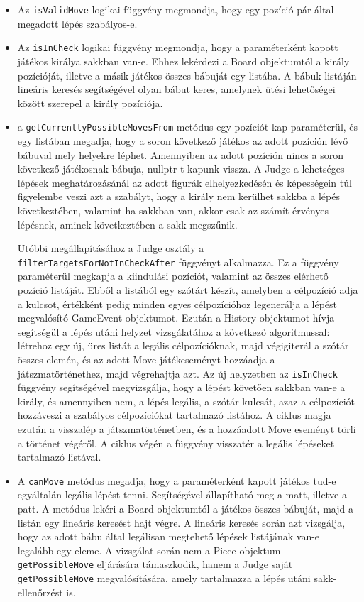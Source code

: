\documentclass[12pt, twoside]{report}
\begin{document}
\begin{itemize}
	\item Az {\tt isValidMove} logikai függvény megmondja, hogy egy pozíció-pár által megadott lépés szabályos-e.
	
	\item Az {\tt isInCheck} logikai függvény megmondja, hogy a paraméterként kapott játékos királya sakkban van-e. Ehhez lekérdezi a Board objektumtól a király pozícióját, illetve a másik játékos összes bábuját egy listába. A bábuk listáján lineáris keresés segítségével olyan bábut keres, amelynek ütési lehetőségei között szerepel a király pozíciója.
	
	\item a {\tt getCurrentlyPossibleMovesFrom} metódus egy pozíciót kap paraméterül,  és egy listában megadja, hogy a soron következő játékos az adott pozíción lévő bábuval mely helyekre léphet. Amennyiben az adott pozíción nincs a soron következő játékosnak bábuja, nullptr-t kapunk vissza. A Judge a lehetséges lépések meghatározásánál az adott figurák elhelyezkedésén és képességein túl figyelembe veszi azt a szabályt, hogy a király nem kerülhet sakkba a lépés következtében, valamint ha sakkban van, akkor csak az számít érvényes lépésnek, aminek következtében a sakk megszűnik.
	
	Utóbbi megállapításához a Judge osztály a {\tt filterTargetsForNotInCheckAfter} függvényt alkalmazza. Ez a függvény paraméterül megkapja a kiindulási pozíciót, valamint az összes elérhető pozíció listáját. Ebből a listából egy szótárt készít, amelyben a célpozíció adja a kulcsot, értékként pedig minden egyes célpozícióhoz legenerálja a lépést megvalósító GameEvent objektumot. Ezután a History objektumot hívja segítségül a lépés utáni helyzet vizsgálatához a következő algoritmussal: létrehoz egy új, üres listát a legális célpozícióknak, majd végigiterál a szótár összes elemén, és az adott Move játékeseményt hozzáadja a játszmatörténethez, majd végrehajtja azt. Az új helyzetben az {\tt isInCheck} függvény segítségével megvizsgálja, hogy a lépést követően sakkban van-e a király, és amennyiben nem, a lépés legális, a szótár kulcsát, azaz a célpozíciót hozzáveszi a szabályos célpozíciókat tartalmazó listához. A ciklus magja ezután a visszalép a játszmatörténetben, és a hozzáadott Move eseményt törli a történet végéről. A ciklus végén a függvény visszatér a legális lépéseket tartalmazó listával. 

	\item A {\tt canMove} metódus megadja, hogy a paraméterként kapott játékos tud-e egyáltalán legális lépést tenni. Segítségével állapítható meg a matt, illetve a patt. A metódus lekéri a Board objektumtól a játékos összes bábuját, majd a listán egy lineáris keresést hajt végre. A lineáris keresés során azt vizsgálja, hogy az adott bábu által legálisan megtehető lépések listájának van-e legalább egy eleme. A vizsgálat során nem a Piece objektum {\tt getPossibleMove} eljárására támaszkodik, hanem a Judge saját {\tt getPossibleMove} megvalósítására, amely tartalmazza a lépés utáni sakk-ellenőrzést is.
	

\end{itemize}
\end{document}
